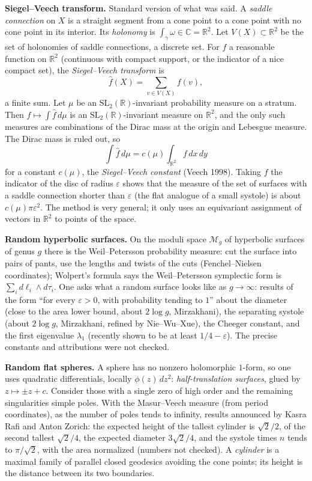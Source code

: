 \medskip\noindent
{\bf Siegel--Veech transform.} Standard
version of what was said. A \emph{saddle
connection} on $X$ is a straight segment from
a cone point to a cone point with no cone
point in its interior. Its \emph{holonomy} is
$\int_\gamma\omega\in
\mathbb{C}=\mathbb{R}^2$.
Let $V(X)\subset\mathbb{R}^2$ be the set of
holonomies of saddle connections, a discrete
set. For $f$ a reasonable function on
$\mathbb{R}^2$ (continuous with compact
support, or the indicator of a nice compact
set), the \emph{Siegel--Veech transform} is
$$
\widehat f(X)=\sum_{v\in V(X)}f(v),
$$
a finite sum. Let $\mu$ be an
$\mathrm{SL}_2(\mathbb{R})$-invariant
probability measure on a stratum. Then
$f\mapsto\int\widehat f\,d\mu$ is an
$\mathrm{SL}_2(\mathbb{R})$-invariant measure
on $\mathbb{R}^2$, and the only such measures
are combinations of the Dirac mass at the
origin and Lebesgue measure. The Dirac mass
is ruled out, so
$$
\int\widehat f\,d\mu
=c(\mu)\int_{\mathbb{R}^2}f\,dx\,dy
$$
for a constant $c(\mu)$, the
\emph{Siegel--Veech constant} (Veech 1998).
Taking $f$ the indicator of the disc of
radius $\varepsilon$ shows that the measure
of the set of surfaces with a saddle
connection shorter than $\varepsilon$ (the
flat analogue of a small systole) is about
$c(\mu)\pi\varepsilon^2$. The method
is very general; it only uses an equivariant
assignment of vectors in $\mathbb{R}^2$ to
points of the space.

\medskip\noindent
{\bf Random hyperbolic surfaces.} On the
moduli space $\mathcal{M}_g$ of hyperbolic
surfaces of genus $g$ there is the
Weil--Petersson probability measure: cut the
surface into pairs of pants, use the lengths
and twists of the cuts (Fenchel--Nielsen
coordinates); Wolpert's formula says the
Weil--Petersson symplectic form is $\sum_i
d\ell_i\wedge d\tau_i$. One asks what a
random surface looks like as $g\to\infty$:
results of the form ``for every
$\varepsilon>0$, with probability tending to
$1$'' about the diameter (close to the area
lower bound, about $2\log g$, Mirzakhani),
the separating systole (about $2\log g$,
Mirzakhani, refined by Nie--Wu--Xue), the
Cheeger constant, and the first eigenvalue
$\lambda_1$ (recently shown to be at least
$1/4-\varepsilon$). The precise constants and
attributions were not checked.

\medskip\noindent
{\bf Random flat spheres.} A sphere has no
nonzero holomorphic $1$-form, so one uses
quadratic differentials, locally
$\phi(z)\,dz^2$: \emph{half-translation
surfaces}, glued by $z\mapsto\pm z+c$.
Consider those with a single zero of high
order and the remaining singularities simple
poles. With the Masur--Veech measure (from
period coordinates), as the number of poles
tends to infinity, results announced by Kasra
Rafi and Anton Zorich: the expected height of
the tallest cylinder is $\sqrt{2}/2$, of the
second tallest $\sqrt{2}/4$, the expected
diameter $3\sqrt{2}/4$, and the systole times
$n$ tends to $\pi/\sqrt{2}$, with the area
normalized (numbers not checked). A \emph{cylinder} is a maximal
family of parallel closed geodesics avoiding
the cone points; its height is the distance
between its two boundaries.

